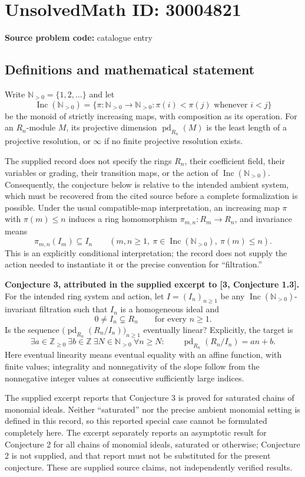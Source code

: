 \documentclass[11pt]{article}
\newcommand{\N}{\mathbb{N}}
\newcommand{\Z}{\mathbb{Z}}
\begin{document}
\section*{UnsolvedMath ID: 30004821}
\textbf{Source problem code:} catalogue entry
\subsection{Definitions and mathematical statement}
Write \(\N_{>0}=\{1,2,\ldots\}\) and let
\[
\operatorname{Inc}(\N_{>0})=\{\pi:\N_{>0}\longrightarrow\N_{>0}:\pi(i)<\pi(j)\text{ whenever }i<j\}
\]
be the monoid of strictly increasing maps, with composition as its operation. For an \(R_n\)-module \(M\), its projective dimension \(\operatorname{pd}_{R_n}(M)\) is the least length of a projective resolution, or \(\infty\) if no finite projective resolution exists.

The supplied record does not specify the rings \(R_n\), their coefficient field, their variables or grading, their transition maps, or the action of \(\operatorname{Inc}(\N_{>0})\). Consequently, the conjecture below is relative to the intended ambient system, which must be recovered from the cited source before a complete formalization is possible. Under the usual compatible-map interpretation, an increasing map \(\pi\) with \(\pi(m)\leq n\) induces a ring homomorphism \(\pi_{m,n}:R_m\to R_n\), and invariance means
\[
\pi_{m,n}(I_m)\subseteq I_n
\qquad(m,n\geq1,\ \pi\in\operatorname{Inc}(\N_{>0}),\ \pi(m)\leq n).
\]
This is an explicitly conditional interpretation; the record does not supply the action needed to instantiate it or the precise convention for ``filtration.''

\textbf{Conjecture 3, attributed in the supplied excerpt to [3, Conjecture 1.3].} For the intended ring system and action, let \(I=(I_n)_{n\geq1}\) be any \(\operatorname{Inc}(\N_{>0})\)-invariant filtration such that \(I_n\) is a homogeneous ideal and
\[
0\neq I_n\subsetneq R_n\qquad\text{for every }n\geq1.
\]
Is the sequence \(\bigl(\operatorname{pd}_{R_n}(R_n/I_n)\bigr)_{n\geq1}\) eventually linear? Explicitly, the target is
\[
\exists a\in\Z_{\geq0}\ \exists b\in\Z\ \exists N\in\N_{>0}\ \forall n\geq N:\qquad
\operatorname{pd}_{R_n}(R_n/I_n)=an+b.
\]
Here eventual linearity means eventual equality with an affine function, with finite values; integrality and nonnegativity of the slope follow from the nonnegative integer values at consecutive sufficiently large indices.

The supplied excerpt reports that Conjecture 3 is proved for saturated chains of monomial ideals. Neither ``saturated'' nor the precise ambient monomial setting is defined in this record, so this reported special case cannot be formulated completely here. The excerpt separately reports an asymptotic result for Conjecture 2 for all chains of monomial ideals, saturated or otherwise; Conjecture 2 is not supplied, and that report must not be substituted for the present conjecture. These are supplied source claims, not independently verified results.
\end{document}
